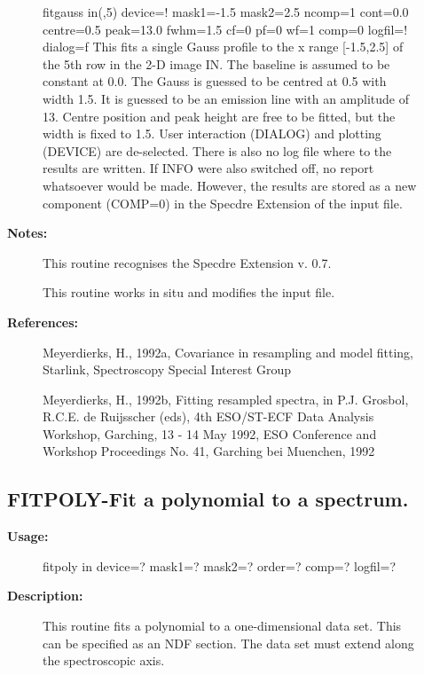 \begin{description}
\begin{description}
\begin{terminalv}
fitgauss in(,5) device=! mask1=-1.5 mask2=2.5
      ncomp=1 cont=0.0 centre=0.5 peak=13.0 fwhm=1.5 cf=0 pf=0 wf=1
      comp=0 logfil=! dialog=f
   This fits a single Gauss profile to the x range [-1.5,2.5] of
   the 5th row in the 2-D image IN. The baseline is assumed to be
   constant at 0.0. The Gauss is guessed to be centred at 0.5 with
   width 1.5. It is guessed to be an emission line with an
   amplitude of 13. Centre position and peak height are free to be
   fitted, but the width is fixed to 1.5. User interaction
   (DIALOG) and plotting (DEVICE) are de-selected. There is also no
   log file where to the results are written. If INFO were also
   switched off, no report whatsoever would be made. However, the
   results are stored as a new component (COMP=0) in the Specdre
   Extension of the input file.
\end{terminalv}

\item [\textbf{Notes:}]
This routine recognises the Specdre Extension v. 0.7.

This routine works in situ and modifies the input file.

\item [\textbf{References:}]
   Meyerdierks, H., 1992a, Covariance in resampling and model fitting,
   Starlink, Spectroscopy Special Interest Group

   Meyerdierks, H., 1992b, Fitting resampled spectra, in P.J.
   Grosbol, R.C.E. de Ruijsscher (eds), 4th ESO/ST-ECF Data Analysis
   Workshop, Garching, 13 - 14 May 1992, ESO Conference and Workshop
   Proceedings No. 41, Garching bei Muenchen, 1992
\end{description}
\subsection{FITPOLY-\label{FITPOLY}Fit a polynomial to a spectrum.}
\begin{description}

\item [\textbf{Usage:}]

   fitpoly in device=? mask1=? mask2=? order=? comp=? logfil=?


\item [\textbf{Description:}]

   This routine fits a polynomial to a one-dimensional data set. This
   can be specified as an NDF section. The data set must extend along
   the spectroscopic axis.



\end{description}
\end{description}

